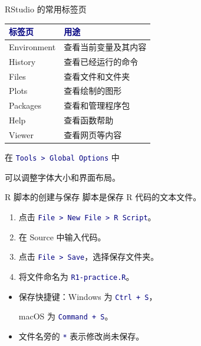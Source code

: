 \documentclass[14pt,compress,t,noamsthm,notheorem,table,handout,fontset=none]{ctexbeamer}
\newcommand{\code}[1]{\textcolor{navy}{\texttt{#1}}}
\newcommand{\thead}[1]{\textcolor{navy}{\textbf{#1}}}
\begin{document}
\begin{frame}{RStudio 的常用标签页}
  \small
  \vspace{0.4em}
  \renewcommand{\arraystretch}{1.15}
  \begin{tabular*}{\linewidth}{@{\extracolsep{\fill}}lp{}@{}}
    \toprule
    \thead{标签页} & \thead{用途} \\
    \midrule
    Environment & 查看当前变量及其内容 \\
    History & 查看已经运行的命令 \\
    Files & 查看文件和文件夹 \\
    Plots & 查看绘制的图形 \\
    Packages & 查看和管理程序包 \\
    Help & 查看函数帮助 \\
    Viewer & 查看网页等内容 \\
    \bottomrule
  \end{tabular*}\par
  \vspace{0.5em}
  在 \code{Tools > Global Options} 中\par 可以调整字体大小和界面布局。
\end{frame}

\begin{frame}{R 脚本的创建与保存}
  脚本是保存 R 代码的文本文件。
  \begin{enumerate}
    \item 点击 \code{File > New File > R Script}。
    \item 在 Source 中输入代码。
    \item 点击 \code{File > Save}，选择保存文件夹。
    \item 将文件命名为 \code{R1-practice.R}。
  \end{enumerate}
  \vspace{0.5em}
  \begin{itemize}
    \item 保存快捷键：Windows 为 \code{Ctrl + S}，\par
      macOS 为 \code{Command + S}。
    \item 文件名旁的 \code{*} 表示修改尚未保存。
  \end{itemize}
\end{frame}
\end{document}
